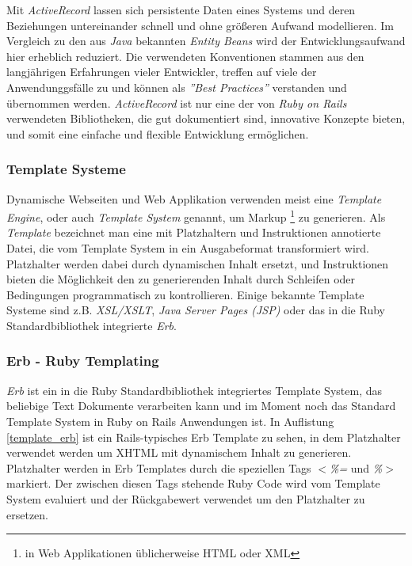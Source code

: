 Mit \textit{ActiveRecord} lassen sich persistente Daten eines Systems
und deren Beziehungen untereinander schnell und ohne größeren Aufwand
modellieren. Im Vergleich zu den aus \textit{Java} bekannten
\textit{Entity Beans} wird der Entwicklungsaufwand hier erheblich
reduziert. Die verwendeten Konventionen stammen aus den langjährigen
Erfahrungen vieler Entwickler, treffen auf viele der Anwendunggsfälle
zu und können als \textit{''Best Practices''} verstanden und
über\-nommen werden. \textit{ActiveRecord} ist nur eine der von
\textit{Ruby on Rails} verwendeten Bibliotheken, die gut dokumentiert
sind, innovative Konzepte bieten, und somit eine einfache und flexible
Entwicklung ermöglichen.

\subsubsection{Template Systeme}

Dynamische Webseiten und Web Applikation verwenden meist eine
\textit{Template Engine}, oder auch \textit{Template System} genannt,
um Markup \footnote{in Web Applikationen üblicherweise HTML oder XML}
zu generieren. Als \textit{Template} bezeichnet man eine mit
Platzhaltern und Instruktionen annotierte Datei, die vom Template
System in ein Ausgabeformat transformiert wird. Platzhalter werden
dabei durch dynamischen Inhalt ersetzt, und Instruktionen bieten die
Möglichkeit den zu generierenden Inhalt durch Schleifen oder
Bedingungen programmatisch zu kontrollieren. Einige bekannte Template
Systeme sind z.B. \textit{XSL/XSLT}, \textit{Java Server Pages (JSP)}
oder das in die Ruby Standardbibliothek integrierte \textit{Erb}.

\subsubsection{Erb - Ruby Templating}

\textit{Erb} ist ein in die Ruby Standardbibliothek integriertes
Template System, das beliebige Text Dokumente verarbeiten kann und im
Moment noch das Standard Template System in Ruby on Rails Anwendungen
ist. In Auflistung \ref{template_erb} ist ein Rails-typisches Erb
Template zu sehen, in dem Platzhalter verwendet werden um XHTML mit
dynamischem Inhalt zu generieren. Platzhalter werden in Erb Templates
durch die speziellen Tags \textit{$<$\%=} und \textit{\%$>$}
markiert. Der zwischen diesen Tags stehende Ruby Code wird vom
Template System evaluiert und der Rückgabe\-wert verwendet um den
Platzhalter zu ersetzen.

